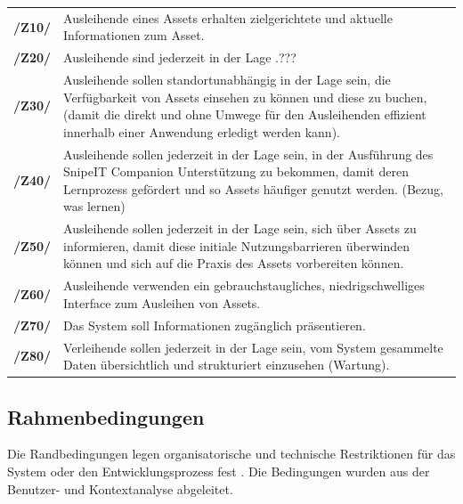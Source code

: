 \begin{center}
        \renewcommand{\arraystretch}{1.5}
        \begin{tabular}{p{}p{}}
                \hline
                \textbf{/Z10/} & Ausleihende eines Assets erhalten zielgerichtete und aktuelle
                Informationen zum Asset. \\
                \textbf{/Z20/} & Ausleihende sind jederzeit in der Lage .??? \\
                \textbf{/Z30/} & Ausleihende sollen standortunabhängig in der Lage sein, die
                Verfügbarkeit von Assets einsehen zu können und diese zu buchen, (damit die
                 direkt und ohne Umwege für den Ausleihenden effizient innerhalb einer
                Anwendung erledigt werden kann). \\
                \textbf{/Z40/} & Ausleihende sollen jederzeit in der Lage sein, in der Ausführung des
                SnipeIT Companion Unterstützung zu bekommen, damit deren Lernprozess gefördert
                und so Assets häufiger genutzt werden. (Bezug, was lernen) \\
                \textbf{/Z50/} & Ausleihende sollen jederzeit in der Lage sein, sich über Assets zu
                informieren, damit diese initiale Nutzungsbarrieren überwinden können und sich auf
                die Praxis des Assets vorbereiten können.\\
                 \textbf{/Z60/} & Ausleihende
                verwenden ein gebrauchstaugliches, niedrigschwelliges Interface zum Ausleihen von
                Assets. \\
                \textbf{/Z70/} & Das System soll Informationen zugänglich präsentieren.\\
                \textbf{/Z80/} & Verleihende sollen jederzeit in der Lage sein, vom System
                gesammelte Daten übersichtlich und strukturiert einzusehen (Wartung).\\
                \hline
        \end{tabular}
\end{center}

\subsection{Rahmenbedingungen}
\label{section:rahmen}
Die Randbedingungen legen organisatorische und technische Restriktionen für das System oder den
Entwicklungsprozess fest \cite{balzert2009}. Die Bedingungen wurden aus der Benutzer- und
Kontextanalyse abgeleitet.

